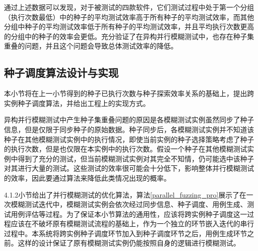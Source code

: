\documentclass[master]{thesis-uestc}
\begin{document}
通过上述数据可以发现，对于被测试的四款软件，它们测试过程中处于第一个分组（执行次数最低）中的种子的平均测试效率高于所有种子的平均测试效率，而其他分组中种子的平均测试效率低于所有种子的平均测试效率，并且平均执行次数更高的分组中的种子的效率会更低。充分验证了在异构并行模糊测试中，也存在种子集重叠的问题，并且这个问题会导致总体测试效率的降低。






\subsection{种子调度算法设计与实现}

本小节将在上一小节得到的种子已执行次数与种子探索效率关系的基础上，提出跨实例种子调度算法，并给出工程上的实现方式。

异构并行模糊测试中产生种子集重叠问题的原因是各模糊测试实例虽然同步了种子信息，但是仅限于同步种子的原始数据。种子同步后，各模糊测试实例并不知道该种子在其他模糊测试实例中的执行情况，即使当前实例的种子选择策略考虑了种子的执行次数，但是也仅限在本实例中的执行次数。假设一个种子在其他模糊测试实例中得到了充分的测试，但当前模糊测试实例对其完全不知情，仍可能选中该种子对其进行大量的测试。这些测试的效率很可能会十分低下，影响整体并行模糊测试的效率，因此要通过算法来降低此类情况出现的概率。

4.1.2小节给出了并行模糊测试的优化算法，算法\ref{parallel_fuzzing_pro}展示了在一次模糊测试迭代中，模糊测试实例会依次经过同步信息、种子调度、用例生成、测试用例评估等过程。为了保证本小节算法的通用性，应该将跨实例种子调度这一过程应该在不破坏原有模糊测试流程的基础上，作为一个独立的环节嵌入迭代的串行过程中。本系统将跨实例种子调度环节加入到种子调度环节之后，用例生成环节之前。这样的设计保证了原有模糊测试实例仍能按照自身的逻辑进行模糊测试。
\end{document}
